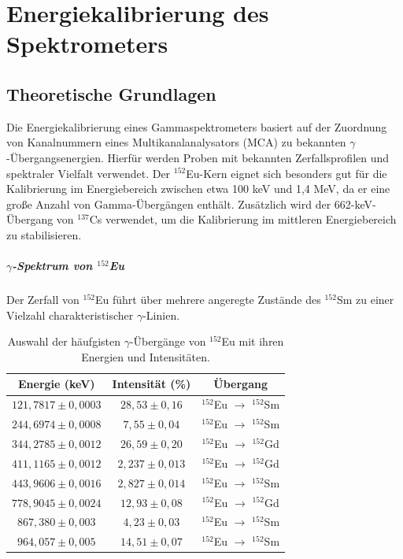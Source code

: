 \chapter{Energiekalibrierung des Spektrometers}
\section{Theoretische Grundlagen}
Die Energiekalibrierung eines Gammaspektrometers basiert auf der Zuordnung von Kanalnummern eines Multikanalanalysators (MCA) zu bekannten $\gamma$-Übergangsenergien. Hierfür werden Proben mit bekannten Zerfallsprofilen und spektraler Vielfalt verwendet. Der $^{152}$Eu-Kern eignet sich besonders gut für die Kalibrierung im Energiebereich zwischen etwa 100 keV und 1,4 MeV, da er eine große Anzahl von Gamma-Übergängen enthält. Zusätzlich wird der 662-keV-Übergang von $^{137}$Cs verwendet, um die Kalibrierung im mittleren Energiebereich zu stabilisieren.
\paragraph{$\gamma$-Spektrum von $^{152}$Eu}
Der Zerfall von $^{152}$Eu führt über mehrere angeregte Zustände des $^{152}$Sm zu einer Vielzahl charakteristischer $\gamma$-Linien.\\
\begin{table}[htbp]
    \centering
    \begin{tabular}{c|c|c}
        \textbf{Energie (keV)} & \textbf{Intensität (\%)} & \textbf{Übergang} \\
        \hline
        $121,7817\pm0,0003 $ & $28,53 \pm 0,16$ & $^{152}$Eu $\rightarrow$ $^{152}$Sm \\
        $244,6974 \pm 0,0008 $ & $7,55 \pm 0,04$ & $^{152}$Eu $\rightarrow$ $^{152}$Sm \\
        $344,2785 \pm 0,0012 $ & $26,59 \pm 0,20$ & $^{152}$Eu $\rightarrow$ $^{152}$Gd \\
        $411,1165 \pm 0,0012 $ & $2,237 \pm 0,013$ & $^{152}$Eu $\rightarrow$ $^{152}$Gd \\
        $443,9606 \pm 0,0016 $ & $2,827 \pm 0,014$ & $^{152}$Eu $\rightarrow$ $^{152}$Sm \\
        $778,9045 \pm 0,0024 $ & $12,93 \pm 0,08$ & $^{152}$Eu $\rightarrow$ $^{152}$Gd \\
        $867,380 \pm 0,003 $ & $4,23 \pm 0,03$ & $^{152}$Eu $\rightarrow$ $^{152}$Sm \\
        $964,057 \pm 0,005$&$14,51 \pm 0,07$&$^{152}$Eu $\rightarrow$ $^{152}$Sm\\
    \end{tabular}
    \caption{Auswahl der häufgisten $\gamma$-Übergänge von $^{152}$Eu mit ihren Energien und Intensitäten.\cite{Eu-peaks}}
    \label{tab:europium_lines}
    \end{table}

